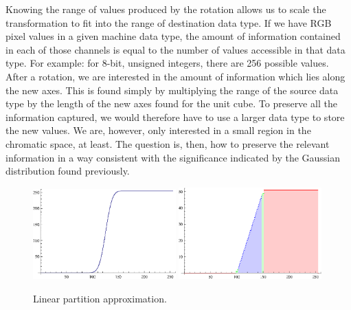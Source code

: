 \documentclass[10pt,a4paper]{article}
\begin{document}
Knowing the range of values produced by the rotation allows us to scale the transformation to fit into the range of destination data type. If we have RGB pixel values in a given machine data type, the amount of information contained in each of those channels is equal to the number of values accessible in that data type. For example: for 8-bit, unsigned integers, there are 256 possible values. After a rotation, we are interested in the amount of information which lies along the new axes. This is found simply by multiplying the range of the source data type by the length of the new axes found for the unit cube. To preserve all the information captured, we would therefore have to use a larger data type to store the new values. We are, however, only interested in a small region in the chromatic space, at least. The question is, then, how to preserve the relevant information in a way consistent with the significance indicated by the Gaussian distribution found previously.



\begin{figure}[h!]
  \caption{Linear partition approximation.}
  \label{fig:Partition}
  \centering
    \includegraphics[width=0.49\textwidth]{partitionSmooth.eps}
    \includegraphics[width=0.49\textwidth]{partitionColor.eps}
\end{figure}
\end{document}
